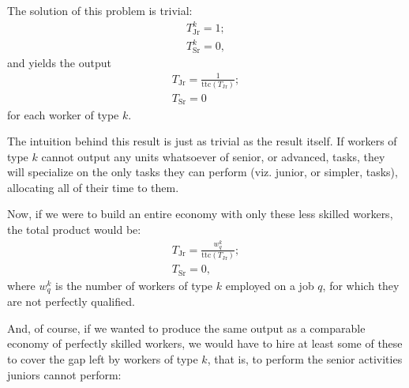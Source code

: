 \documentclass{elsarticle} %
\begin{document}
The solution of this problem is trivial:
\begin{gather*}
    T_{\text{Jr}}^{k} = 1
    ;\\
    T_{\text{Sr}}^{k} = 0
    ,
\end{gather*}
and yields the output
\begin{gather*}
    T_{\text{Jr}} = 
    \frac{1}{\text{ttc}(T_{\text{Jr}})}
    ;\\
    T_{\text{Sr}} = 0
\end{gather*}
for each worker of type $k$.

The intuition behind this result is just as trivial as the result itself. If workers of type $k$ cannot output any units whatsoever of senior, or advanced, tasks, they will specialize on the only tasks they can perform (viz. junior, or simpler, tasks), allocating all of their time to them.

Now, if we were to build an entire economy with only these less skilled workers, the total product would be:
\begin{gather*}
    T_{\text{Jr}} = 
    \frac{w_{q}^{k}}{\text{ttc}(T_{\text{Jr}})}
    ;\\
    T_{\text{Sr}} = 0
    ,
\end{gather*}
where $w_{q}^{k}$ is the number of workers of type $k$ employed on a job $q$, for which they are not perfectly qualified.

And, of course, if we wanted to produce the same output as a comparable economy of perfectly skilled workers, we would have to hire at least some of these to cover the gap left by workers of type $k$, that is, to perform the senior activities juniors cannot perform:
\end{document}
